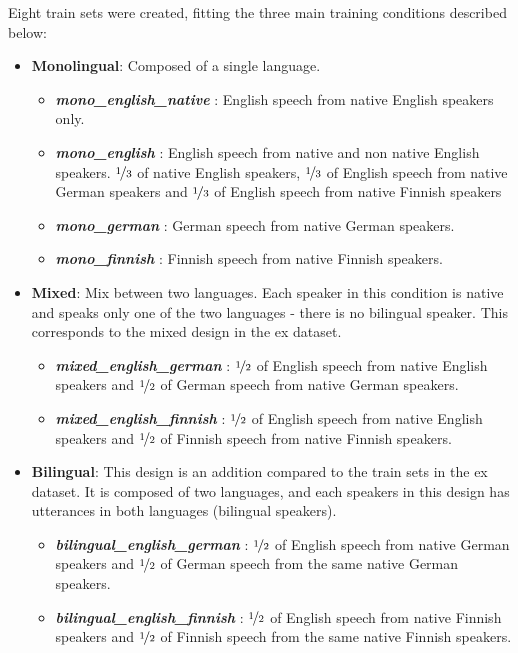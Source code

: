 \par \noindent Eight train sets were created, fitting the three main training conditions described below:
\begin{itemize}[itemsep=2pt,topsep=4pt,itemindent=4pt]
    \renewcommand\labelitemi{$\ast$}
    \item \textbf{Monolingual}: Composed of a single language. 
        \begin{itemize}[itemsep=1pt,topsep=2pt]
        \renewcommand\labelitemi{--}
        \item \textbf{\textit{mono\_english\_native}} : English speech from native English speakers only.
        \item \textbf{\textit{mono\_english}} : English speech from native and non native English speakers. $\nicefrac{1}{3}$ of native English speakers, $\nicefrac{1}{3}$ of English speech from native German speakers and $\nicefrac{1}{3}$ of English speech from native Finnish speakers
        \item \textbf{\textit{mono\_german}} : German speech from native German speakers.
        \item \textbf{\textit{mono\_finnish}} : Finnish speech from native Finnish speakers.
        \end{itemize}
    \item \textbf{Mixed}: Mix between two languages. Each speaker in this condition is native and speaks only one of the two languages - there is no bilingual speaker. This corresponds to the mixed design in the \acrshort{ex} dataset. 
        \begin{itemize}[itemsep=1pt,topsep=2pt]
        \renewcommand\labelitemi{--}
        \item \textbf{\textit{mixed\_english\_german}} : $\nicefrac{1}{2}$ of English speech from native English speakers and $\nicefrac{1}{2}$ of German speech from native German speakers.
        \item \textbf{\textit{mixed\_english\_finnish}} : $\nicefrac{1}{2}$ of English speech from native English speakers and $\nicefrac{1}{2}$ of Finnish speech from native Finnish speakers.
        \end{itemize}
    \item \textbf{Bilingual}: This design is an addition compared to the train sets in the \acrshort{ex} dataset. It is composed of two languages, and each speakers in this design has utterances in both languages (\ie bilingual speakers). 
        \begin{itemize}[itemsep=1pt,topsep=2pt]
        \renewcommand\labelitemi{--}
        \item \textbf{\textit{bilingual\_english\_german}} : $\nicefrac{1}{2}$ of English speech from native German speakers and $\nicefrac{1}{2}$ of German speech from the same native German speakers.
        \item \textbf{\textit{bilingual\_english\_finnish}} : $\nicefrac{1}{2}$ of English speech from native Finnish speakers and $\nicefrac{1}{2}$ of Finnish speech from the same native Finnish speakers.
        \end{itemize}
\end{itemize}

